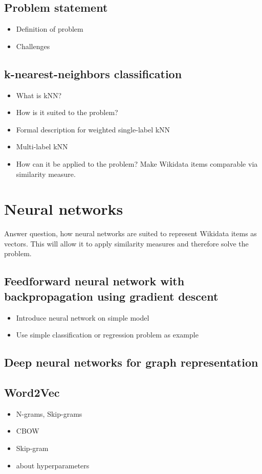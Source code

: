 \documentclass{scrartcl} %
\begin{document}
\subsection{Problem statement}
\begin{itemize}
\item Definition of problem
\item Challenges
\end{itemize}

\subsection{k-nearest-neighbors classification}
\begin{itemize}
\item What is kNN?
\item How is it suited to the problem?
\item Formal description for weighted single-label kNN
\item Multi-label kNN
\item How can it be applied to the problem? Make Wikidata items comparable via similarity measure.
\end{itemize}

\section{Neural networks}
Answer question, how neural networks are suited to represent Wikidata items as vectors.
This will allow it to apply similarity measures and therefore solve the problem.

\subsection{Feedforward neural network with backpropagation using gradient descent}
\begin{itemize}
\item Introduce neural network on simple model
\item Use simple classification or regression problem as example
\end{itemize}

\subsection{Deep neural networks for graph representation}

\subsection{Word2Vec}
\begin{itemize}
\item N-grams, Skip-grams
\item CBOW
\item Skip-gram
\item about hyperparameters
\end{itemize}
\end{document}
